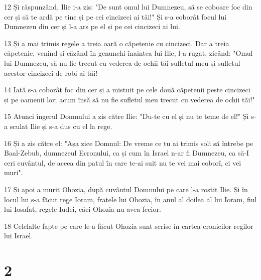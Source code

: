 \par 12 Și răspunzând, Ilie i-a zis: "De sunt omul lui Dumnezeu, să se coboare foc din cer și să te ardă pe tine și pe cei cincizeci ai tăi!" Și s-a coborât focul lui Dumnezeu din cer și l-a ars pe el și pe cei cincizeci ai lui.
\par 13 Și a mai trimis regele a treia oară o căpetenie cu cincizeci. Dar a treia căpetenie, venind și căzând în genunchi înaintea lui Ilie, l-a rugat, zicând: "Omul lui Dumnezeu, să nu fie trecut cu vederea de ochii tăi sufletul meu și sufletul acestor cincizeci de robi ai tăi!
\par 14 Iată s-a coborât foc din cer și a mistuit pe cele două căpetenii peste cincizeci și pe oamenii lor; acum însă să nu fie sufletul meu trecut cu vederea de ochii tăi!"
\par 15 Atunci îngerul Domnului a zis către Ilie: "Du-te cu el și nu te teme de el!" Și s-a sculat Ilie și s-a dus cu el la rege.
\par 16 Și a zis către el: "Așa zice Domnul: De vreme ce tu ai trimis soli să întrebe pe Baal-Zebub, dumnezeul Ecronului, ca și cum în Israel n-ar fi Dumnezeu, ca să-I ceri cuvântul, de aceea din patul în care te-ai suit nu te vei mai coborî, ci vei muri".
\par 17 Și apoi a murit Ohozia, după cuvântul Domnului pe care l-a rostit Ilie. Și în locul lui s-a făcut rege Ioram, fratele lui Ohozia, în anul al doilea al lui Ioram, fiul lui Iosafat, regele Iudei, căci Ohozia nu avea fecior.
\par 18 Celelalte fapte pe care le-a făcut Ohozia sunt scrise în cartea cronicilor regilor lui Israel.

\chapter{2}

